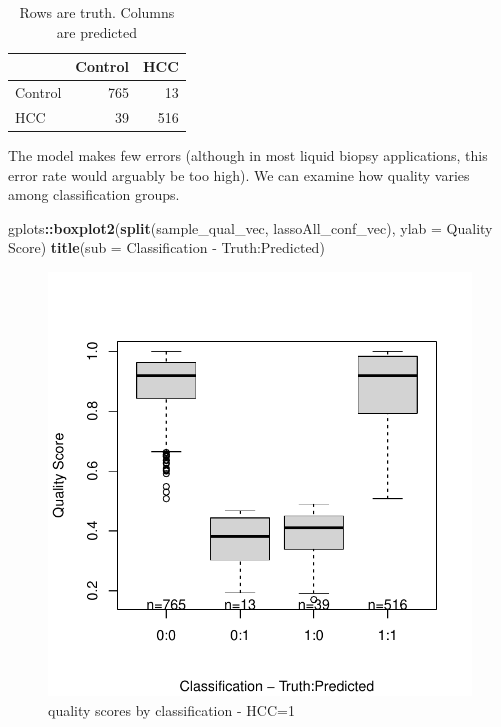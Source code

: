 \documentclass[
]{book}
\newenvironment{Shaded}{\begin{snugshade}}{\end{snugshade}}
\newcommand{\DataTypeTok}[1]{\textcolor[rgb]{0.13,0.29,0.53}{#1}}
\newcommand{\KeywordTok}[1]{\textcolor[rgb]{0.13,0.29,0.53}{\textbf{#1}}}
\newcommand{\NormalTok}[1]{#1}
\newcommand{\OperatorTok}[1]{\textcolor[rgb]{0.81,0.36,0.00}{\textbf{#1}}}
\newcommand{\StringTok}[1]{\textcolor[rgb]{0.31,0.60,0.02}{#1}}
\begin{document}
\begin{table}

\caption{\label{tab:print-conf}Rows are truth.  Columns are predicted}
\centering
\begin{tabular}[t]{l|r|r}
\hline
  & Control & HCC\\
\hline
Control & 765 & 13\\
\hline
HCC & 39 & 516\\
\hline
\end{tabular}
\end{table}

The model makes few errors (although in most liquid biopsy applications,
this error rate would arguably be too high). We can examine how quality
varies among classification groups.

\begin{Shaded}
\begin{Highlighting}[]
\NormalTok{gplots}\OperatorTok{::}\KeywordTok{boxplot2}\NormalTok{(}\KeywordTok{split}\NormalTok{(sample\_qual\_vec, lassoAll\_conf\_vec), }\DataTypeTok{ylab =} \StringTok{\textquotesingle{}Quality Score\textquotesingle{}}\NormalTok{)}
\KeywordTok{title}\NormalTok{(}\DataTypeTok{sub =} \StringTok{\textquotesingle{}Classification {-} Truth:Predicted\textquotesingle{}}\NormalTok{)}
\end{Highlighting}
\end{Shaded}

\begin{figure}
\centering
\includegraphics{Static/figures/plot-qual-conf-1.pdf}
\caption{\label{fig:plot-qual-conf}quality scores by classification - HCC=1}
\end{figure}
\end{document}

